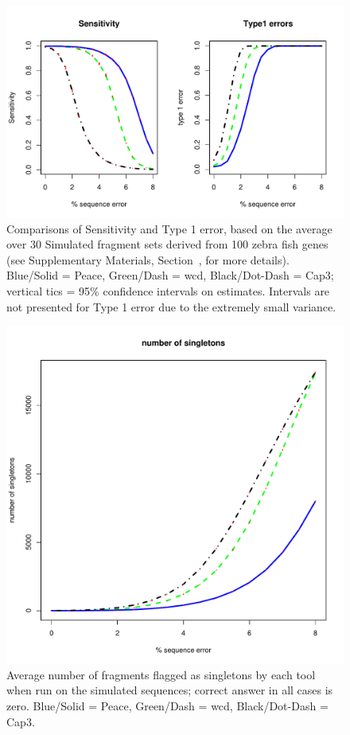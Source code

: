 \documentclass[a4,center,fleqn]{NAR}
\begin{document}
\begin{figure}[b]
\centerline{
\includegraphics[scale=0.5]{pics.d/SeT1.pdf} 
}
\label{SeT1}
\caption{Comparisons of Sensitivity and Type 1 error, based on the
  average over 30 Simulated fragment sets derived from 100 zebra fish genes
  (see Supplementary Materials, Section~\href{sim_results}, for more
  details).   Blue/Solid = {\sc Peace}, Green/Dash =
  {\sc wcd}, Black/Dot-Dash = {\sc Cap3}; vertical tics = 95\% confidence
  intervals on estimates.  Intervals are not presented for Type 1
  error due to the extremely small variance.}
\end{figure}

\begin{figure}[b]
\centerline{
\includegraphics[scale=0.35]{pics.d/singletons.pdf}
}
\label{singletons}
\caption{Average number of fragments flagged as singletons by each tool
  when run on the simulated sequences; correct answer in all cases is
  zero.  Blue/Solid = {\sc Peace}, Green/Dash = {\sc wcd},
  Black/Dot-Dash = {\sc Cap3}.}
\end{figure}
\end{document}
